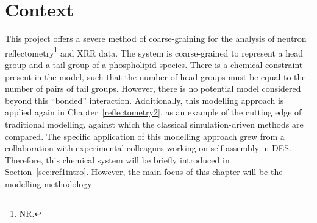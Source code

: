 \section*{Context}
This project offers a severe method of coarse-graining for the analysis of neutron reflectometry\footnote{NR.} and XRR data.
The system is coarse-grained to represent a head group and a tail group of a phospholipid species.
There is a chemical constraint present in the model, such that the number of head groups must be equal to the number of pairs of tail groups.
However, there is no potential model considered beyond this ``bonded'' interaction.
Additionally, this modelling approach is applied again in Chapter~\ref{reflectometry2}, as an example of the cutting edge of traditional modelling, against which the classical simulation-driven methods are compared.
The specific application of this modelling approach grew from a collaboration with experimental colleagues working on self-assembly in DES.
Therefore, this chemical system will be briefly introduced in Section~\ref{sec:ref1intro}.
However, the main focus of this chapter will be the modelling methodology
